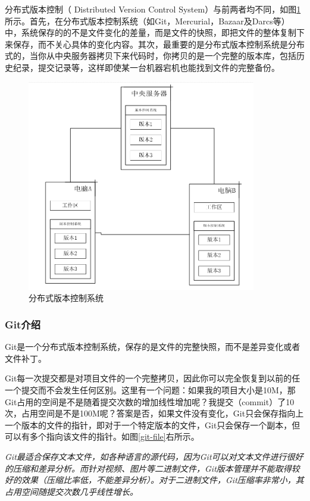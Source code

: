 分布式版本控制（ Distributed Version Control System）与前两者均不同，如图\ref{dis-con}所示。首先，在分布式版本控制系统（如Git，Mercurial，Bazaar及Darcs等）中，系统保存的的不是文件变化的差量，而是文件的快照，即把文件的整体复制下来保存，而不关心具体的变化内容。其次，最重要的是分布式版本控制系统是分布式的，当你从中央服务器拷贝下来代码时，你拷贝的是一个完整的版本库，包括历史纪录，提交记录等，这样即使某一台机器宕机也能找到文件的完整备份。

\begin{figure}[ht]
    \centering
    \includegraphics[width=10cm]{image/git/distri.png}
    \caption{分布式版本控制系统}
    \label{dis-con}
\end{figure}

\subsubsection{Git介绍}
Git是一个分布式版本控制系统，保存的是文件的完整快照，而不是差异变化或者文件补丁。

Git每一次提交都是对项目文件的一个完整拷贝，因此你可以完全恢复到以前的任一个提交而不会发生任何区别。这里有一个问题：如果我的项目大小是10M，那Git占用的空间是不是随着提交次数的增加线性增加呢？我提交（commit）了10次，占用空间是不是100M呢？答案是否，如果文件没有变化，Git只会保存指向上一个版本的文件的指针，即对于一个特定版本的文件，Git只会保存一个副本，但可以有多个指向该文件的指针。如图\ref{git-file}右所示。

\begin{remark}
    \textit{Git最适合保存文本文件，如各种语言的源代码，因为Git可以对文本文件进行很好的压缩和差异分析。而针对视频、图片等二进制文件，Git版本管理并不能取得较好的效果（压缩比率低，不能差异分析）。对于二进制文件，Git压缩率非常小，其占用空间随提交次数几乎线性增长。}
\end{remark}

